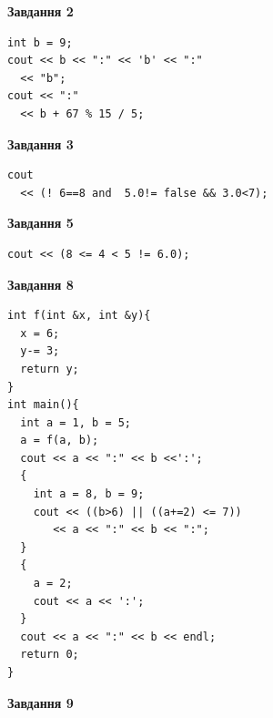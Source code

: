\documentclass[12pt, ukrainian]{article}
\begin{document}
{\begin {large}
\begin{minipage}[t]{7.0cm}
\end{minipage}
\vline \hspace{1mm}
\begin{minipage}[t]{11.0cm}

\begin{center}
\textbf{Завдання 2}
\end{center}
\vspace{-8mm}

\begin{verbatim}
int b = 9;
cout << b << ":" << 'b' << ":" 
  << "b";
cout << ":" 
  << b + 67 % 15 / 5;
\end{verbatim}



\begin{center}
\textbf{Завдання 3}
\end{center}
\vspace{-8mm}

\begin{verbatim}
cout 
  << (! 6==8 and  5.0!= false && 3.0<7);
\end{verbatim}



\begin{center}
\textbf{Завдання 5}
\end{center}
\vspace{-8mm}

\begin{verbatim}
cout << (8 <= 4 < 5 != 6.0);
\end{verbatim}



\begin{center}
\textbf{Завдання 8}
\end{center}
\vspace{-8mm}

\begin{verbatim}
int f(int &x, int &y){
  x = 6;
  y-= 3;
  return y;
}
int main(){
  int a = 1, b = 5;
  a = f(a, b);
  cout << a << ":" << b <<':';
  {
    int a = 8, b = 9;
    cout << ((b>6) || ((a+=2) <= 7))
       << a << ":" << b << ":";
  }
  {
    a = 2;
    cout << a << ':';
  }
  cout << a << ":" << b << endl;
  return 0;
}
\end{verbatim}

\end{minipage}


\begin{minipage}[t]{7.0cm}

\begin{center}
\textbf{Завдання 9}
\end{center}
\vspace{-8mm}


\end{minipage}
\end{large}}
\end{document}
